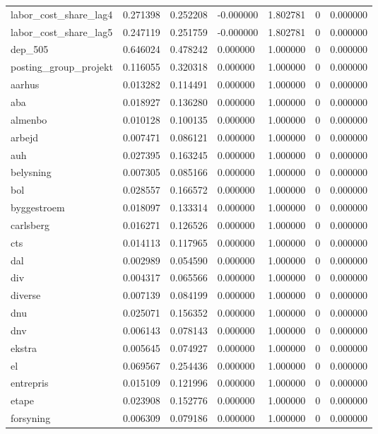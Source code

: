 \begin{landscape}
\begin{longtable}[h!]{lrrllrr}
labor_cost_share_lag4 & 0.271398 & 0.252208 & -0.000000 & 1.802781 & 0 & 0.000000 \\
labor_cost_share_lag5 & 0.247119 & 0.251759 & -0.000000 & 1.802781 & 0 & 0.000000 \\
dep_505 & 0.646024 & 0.478242 & 0.000000 & 1.000000 & 0 & 0.000000 \\
posting_group_projekt & 0.116055 & 0.320318 & 0.000000 & 1.000000 & 0 & 0.000000 \\
aarhus & 0.013282 & 0.114491 & 0.000000 & 1.000000 & 0 & 0.000000 \\
aba & 0.018927 & 0.136280 & 0.000000 & 1.000000 & 0 & 0.000000 \\
almenbo & 0.010128 & 0.100135 & 0.000000 & 1.000000 & 0 & 0.000000 \\
arbejd & 0.007471 & 0.086121 & 0.000000 & 1.000000 & 0 & 0.000000 \\
auh & 0.027395 & 0.163245 & 0.000000 & 1.000000 & 0 & 0.000000 \\
belysning & 0.007305 & 0.085166 & 0.000000 & 1.000000 & 0 & 0.000000 \\
bol & 0.028557 & 0.166572 & 0.000000 & 1.000000 & 0 & 0.000000 \\
byggestroem & 0.018097 & 0.133314 & 0.000000 & 1.000000 & 0 & 0.000000 \\
carlsberg & 0.016271 & 0.126526 & 0.000000 & 1.000000 & 0 & 0.000000 \\
cts & 0.014113 & 0.117965 & 0.000000 & 1.000000 & 0 & 0.000000 \\
dal & 0.002989 & 0.054590 & 0.000000 & 1.000000 & 0 & 0.000000 \\
div & 0.004317 & 0.065566 & 0.000000 & 1.000000 & 0 & 0.000000 \\
diverse & 0.007139 & 0.084199 & 0.000000 & 1.000000 & 0 & 0.000000 \\
dnu & 0.025071 & 0.156352 & 0.000000 & 1.000000 & 0 & 0.000000 \\
dnv & 0.006143 & 0.078143 & 0.000000 & 1.000000 & 0 & 0.000000 \\
ekstra & 0.005645 & 0.074927 & 0.000000 & 1.000000 & 0 & 0.000000 \\
el & 0.069567 & 0.254436 & 0.000000 & 1.000000 & 0 & 0.000000 \\
entrepris & 0.015109 & 0.121996 & 0.000000 & 1.000000 & 0 & 0.000000 \\
etape & 0.023908 & 0.152776 & 0.000000 & 1.000000 & 0 & 0.000000 \\
forsyning & 0.006309 & 0.079186 & 0.000000 & 1.000000 & 0 & 0.000000 \\

\end{longtable}
\end{landscape}
